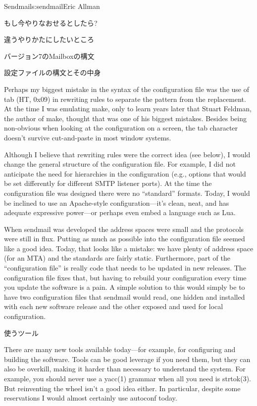 \begin{aosachapter}{Sendmail}{s:sendmail}{Eric Allman}
\begin{aosasect1}{もし今やりなおせるとしたら?}
\begin{aosasect2}{違うやりかたにしたいところ}
\begin{aosasect3}{バージョン7のMailboxの構文}
\end{aosasect3}

\begin{aosasect3}{設定ファイルの構文とその中身}

Perhaps my biggest mistake in the syntax of the configuration file was
the use of tab (HT, 0x09) in rewriting rules
to separate the pattern from the
replacement.  At the time I was emulating make, only to learn years
later that Stuart Feldman, the author of make, thought that was one of
his biggest mistakes. Besides being non-obvious when looking at the
configuration on a screen, the tab character doesn't survive
cut-and-paste in most window systems.

Although I believe that rewriting rules were the correct idea (see
below), I would change the general structure of the configuration
file.  For example, I did not anticipate the need for hierarchies in
the configuration (e.g., options that would be set differently for
different SMTP listener ports). At the time the configuration file was
designed there were no ``standard'' formats. Today, I would be inclined
to use an Apache-style configuration---it's clean, neat, and has
adequate expressive power---or perhaps even embed a language such as Lua.

When sendmail was developed the address spaces were small and the
protocols were still in flux. Putting as much as possible into the
configuration file seemed like a good idea. Today, that looks like a
mistake: we have plenty of address space (for an MTA) and the
standards are fairly static.
Furthermore, part of the ``configuration file'' is really code
that needs to be updated in new releases.
The  configuration file fixes that,
but having to rebuild your configuration every time you update the software
is a pain.
A simple solution to this would simply be
to have two configuration files that sendmail would read, one hidden
and installed with each new software release and the other exposed and
used for local configuration.

\end{aosasect3}

\begin{aosasect3}{使うツール}

There are many new tools available today---for example, for
configuring and building the software. Tools can be good leverage if
you need them, but they can also be overkill, making it harder than
necessary to understand the system. For example, you should never use
a yacc(1) grammar when all you need is strtok(3). But reinventing the
wheel isn't a good idea either.  In particular, despite some
reservations I would almost certainly use autoconf today.


\end{aosasect3}
\end{aosasect2}
\end{aosasect1}
\end{aosachapter}
